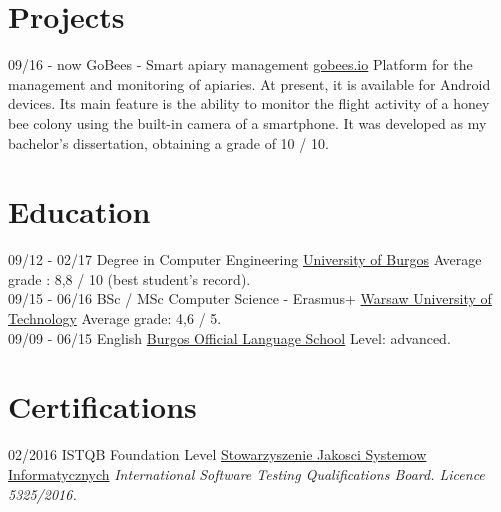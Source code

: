 \documentclass[]{friggeri-cv}
\begin{document}
\section{Projects}
\begin{entrylist}
  \entry
    {09/16 - now}
    {GoBees - Smart apiary management}
    {\href{http://gobees.io/}{gobees.io}}
    {Platform for the management and monitoring of apiaries. At present, it is available for Android devices. Its main feature is the ability to monitor the flight activity of a honey bee colony using the built-in camera of a smartphone. It was developed as my bachelor's dissertation, obtaining a grade of 10 / 10.}
\end{entrylist}

\section{Education}
\begin{entrylist}
  \entry
    {09/12 - 02/17}
    {Degree in Computer Engineering}
    {\href{http://wwww.ubu.es/}{University of Burgos}}
    {Average grade : 8,8 / 10 (best student’s record).\\}
  \entry
    {09/15 - 06/16}
    {BSc / MSc Computer Science - Erasmus+}
    {\href{https://www.pw.edu.pl/}{Warsaw University of Technology}}
    {Average grade: 4,6 / 5.\\}
  \entry
    {09/09 - 06/15}
    {English}
    {\href{http://eoiburgos.centros.educa.jcyl.es/}{Burgos Official Language School}}
    {Level: advanced.\\}
\end{entrylist}

\section{Certifications}
\begin{entrylist}
  \entry
    {02/2016}
    {ISTQB Foundation Level}
    {\href{http://sjsi.org/}{Stowarzyszenie Jakosci Systemow Informatycznych}}
    {\emph{International Software Testing Qualifications Board. Licence 5325/2016.}}
\end{entrylist}

\newpage
\end{document}
